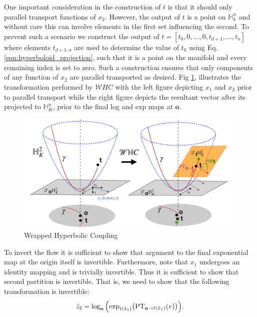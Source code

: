One important consideration in the construction of $t$ is that it should only parallel transport functions of $x_2$. However, the output of $t$ is a point on $\mathbb{H}^n_k$ and without care this can involve elements in the first set influencing the second. To prevent such a scenario we construct the output of $t = [t_0, 0, \dots , 0, t_{d+1}, \dots , t_{n}]$ where elements $t_{d+1:n}$ are used to determine the value of $t_0$ using Eq. \ref{eqn:hyperboloid_projection}, such that it is a point on the manifold and every remaining index is set to zero. Such a construction ensures that only components of any function of $x_2$ are parallel transported as desired. Fig \ref{fig:whc_architecture_diagram}, illustrates the transformation performed by $\mathcal{W}HC$ with the left figure depicting $x_1$ and $x_2$ prior to parallel transport while the right figure depicts the resultant vector after its projected to $\mathbb{H}^n_K$, prior to the final log and exp maps at $\textbf{o}$.

\begin{figure}
    \centering
    \includegraphics[width=\linewidth]{hyperbolic_flows_arch.pdf}
    \vspace{-5mm}
    \caption{Wrapped Hyperbolic Coupling}
    \vspace{-10pt}
    \label{fig:whc_architecture_diagram}
\end{figure}

To invert the flow it is sufficient to show that argument to the final exponential map at the origin itself is invertible. Furthermore, note that $x_1$ undergoes an identity mapping and is trivially invertible. Thus it is sufficient to show that second partition is invertible. That is, we need to show that the following transformation is invertible:
\begin{equation}
     \tilde{z}_{2} = \log_{\textbf{o}}\Big( \textnormal{exp}_{t(\tilde{x}_{1})}\big(\textnormal{PT}_{\textbf{o}\to t(\tilde{x}_{1}) }(v)\big)\Big).
\end{equation}

